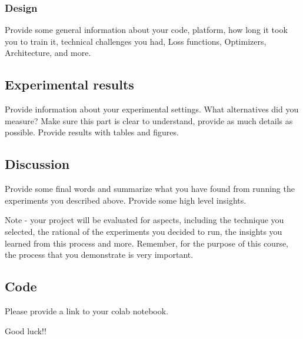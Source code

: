 \documentclass{article}
\begin{document}
\subsubsection{Design}
Provide some general information about your code, platform, how long it took you to train it, technical challenges you had, Loss functions, Optimizers, Architecture, and more.

\subsection{Experimental results}
Provide information about your experimental settings. What alternatives did you measure? Make sure this part is clear to understand, provide as much details as possible. Provide results with tables and figures.

\subsection{Discussion}
Provide some final words and summarize what you have found from running the experiments you described above. Provide some high level insights.

Note - your project will be evaluated for aspects, including the technique you selected, the rational of the experiments you decided to run, the insights you learned from this process and more. Remember, for the purpose of this course, the process that you demonstrate is very  important.

\subsection{Code}

Please provide a link to your colab notebook.

Good luck!!


\end{document}
